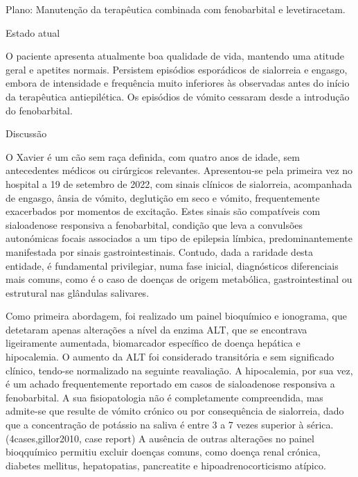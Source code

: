 Plano: Manutenção da terapêutica combinada com fenobarbital e levetiracetam.


Estado atual 


O paciente apresenta atualmente boa qualidade de vida, mantendo uma atitude geral e apetites normais. Persistem episódios esporádicos de sialorreia e engasgo, embora de intensidade e frequência muito inferiores às observadas antes do início da terapêutica antiepilética. Os episódios de vómito cessaram desde a introdução do fenobarbital.

Discussão


O Xavier é um cão sem raça definida, com quatro anos de idade, sem antecedentes médicos ou cirúrgicos relevantes. Apresentou-se pela primeira vez no hospital a 19 de setembro de 2022, com sinais clínicos de sialorreia, acompanhada de engasgo, ânsia de vómito, deglutição em seco e vómito, frequentemente exacerbados por momentos de excitação. Estes sinais são compatíveis com sialoadenose   responsiva a fenobarbital, condição que leva a convulsões autonómicas focais associados a um tipo de epilepsia límbica, predominantemente manifestada por sinais gastrointestinais. Contudo, dada a raridade desta entidade, é fundamental privilegiar, numa fase inicial, diagnósticos diferenciais mais comuns, como é o caso de doenças de origem metabólica, gastrointestinal ou estrutural nas glândulas salivares.


Como primeira abordagem, foi realizado um painel bioquímico e ionograma, que detetaram apenas alterações a nível da enzima ALT, que se encontrava ligeiramente aumentada, biomarcador específico de doença hepática e hipocalemia. O aumento da ALT foi considerado transitória e sem significado clínico, tendo-se normalizado na seguinte reavaliação. A hipocalemia, por sua vez, é um achado frequentemente reportado em casos de sialoadenose responsiva a fenobarbital. A sua fisiopatologia não é completamente compreendida, mas admite-se que resulte de vómito crónico ou por consequência de sialorreia, dado que a concentração de potássio na saliva é entre 3 a 7 vezes superior à sérica. (4cases,gillor2010, case report) A ausência de outras alterações no painel bioqquímico permitiu excluir doenças comuns, como doença renal crónica, diabetes mellitus, hepatopatias, pancreatite e hipoadrenocorticismo atípico.


